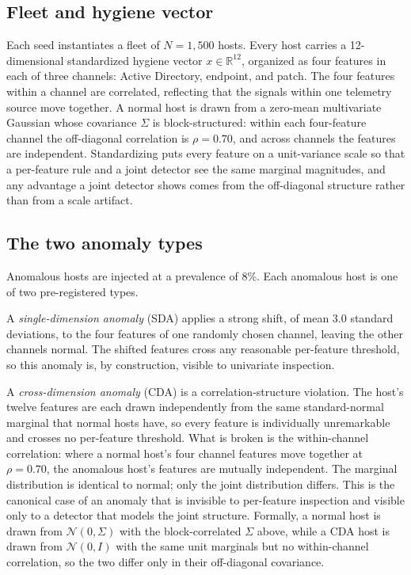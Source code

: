 \documentclass[journal]{IEEEtran}
\begin{document}
\subsection{Fleet and hygiene vector}
Each seed instantiates a fleet of $N = 1{,}500$ hosts. Every host carries a 12-dimensional
standardized hygiene vector $x \in \mathbb{R}^{12}$, organized as four features in each of three
channels: Active Directory, endpoint, and patch. The four features within a channel are correlated,
reflecting that the signals within one telemetry source move together. A normal host is drawn from a
zero-mean multivariate Gaussian whose covariance $\Sigma$ is block-structured: within each
four-feature channel the off-diagonal correlation is $\rho = 0.70$, and across channels the features
are independent. Standardizing puts every feature on a unit-variance scale so that a per-feature
rule and a joint detector see the same marginal magnitudes, and any advantage a joint detector shows
comes from the off-diagonal structure rather than from a scale artifact.

\subsection{The two anomaly types}
Anomalous hosts are injected at a prevalence of $8\%$. Each anomalous host is one of two
pre-registered types.

A \emph{single-dimension anomaly} (SDA) applies a strong shift, of mean $3.0$ standard deviations,
to the four features of one randomly chosen channel, leaving the other channels normal. The shifted
features cross any reasonable per-feature threshold, so this anomaly is, by construction, visible to
univariate inspection.

A \emph{cross-dimension anomaly} (CDA) is a correlation-structure violation. The host's twelve
features are each drawn independently from the same standard-normal marginal that normal hosts have,
so every feature is individually unremarkable and crosses no per-feature threshold. What is broken is
the within-channel correlation: where a normal host's four channel features move together at
$\rho = 0.70$, the anomalous host's features are mutually independent. The marginal distribution is
identical to normal; only the joint distribution differs. This is the canonical case of an anomaly
that is invisible to per-feature inspection and visible only to a detector that models the joint
structure. Formally, a normal host is drawn from $\mathcal{N}(0, \Sigma)$ with the block-correlated
$\Sigma$ above, while a CDA host is drawn from $\mathcal{N}(0, I)$ with the same unit marginals but
no within-channel correlation, so the two differ only in their off-diagonal covariance.
\end{document}
